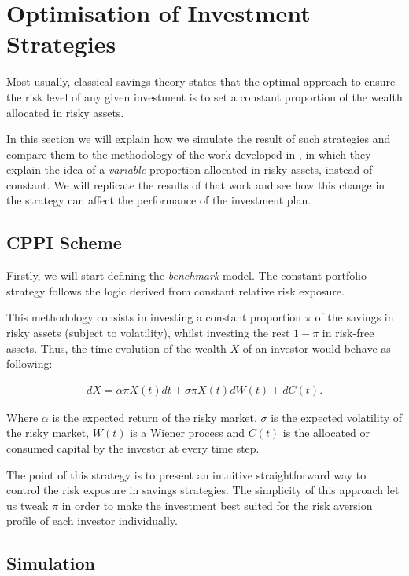 \section{Optimisation of Investment Strategies}

Most usually, classical savings theory states that the optimal approach to ensure the risk level of any given investment is to set a constant proportion of the wealth allocated in risky assets.

In this section we will explain how we simulate the result of such strategies and compare them to the methodology of the work developed in \cite{a:guillen-optimisation}, in which they explain the idea of a \emph{variable} proportion allocated in risky assets, instead of constant. We will replicate the results of that work and see how this change in the strategy can affect the performance of the investment plan.

\subsection{CPPI Scheme}

Firstly, we will start defining the \textit{benchmark} model. The constant portfolio strategy follows the logic derived from constant relative risk exposure.

This methodology consists in investing a constant proportion $\pi$ of the savings in risky assets (subject to volatility), whilst investing the rest $1 - \pi$ in risk-free assets. Thus, the time evolution of the wealth $X$ of an investor would behave as following:

\begin{align}
	dX = \alpha \pi X(t)dt + \sigma \pi X(t)dW(t) + dC(t)\textit{.}
\end{align}

Where $\alpha$ is the expected return of the risky market, $\sigma$ is the expected volatility of the risky market, $W(t)$ is a Wiener process and $C(t)$ is the allocated or consumed capital by the investor at every time step.

The point of this strategy is to present an intuitive straightforward way to control the risk exposure in savings strategies. The simplicity of this approach let us tweak $\pi$ in order to make the investment best suited for the risk aversion profile of each investor individually.

\subsection*{Simulation}

